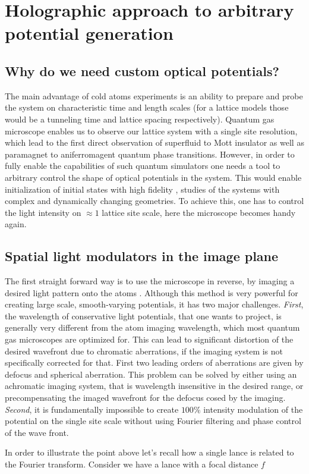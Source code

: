 
\chapter{Holographic approach to arbitrary potential generation}

\section{Why do we need custom optical potentials?}
The main advantage of cold atoms experiments is an ability to prepare and probe the system on characteristic time and length scales (for a lattice models those would be a tunneling time and lattice spacing respectively). Quantum gas microscope enables us to observe our lattice system with a single site resolution, which lead to the first direct observation of superfluid to Mott insulator \cite{Bakr2010, bloch} as well as paramagnet to aniferromagent \cite{Simon2011, Parsons??} quantum phase transitions. However, in order to fully enable the capabilities of such quantum simulators one needs a tool to arbitrary control the shape of optical potentials in the system. This would enable initialization of initial states with high fidelity \cite{us, somebody else?}, studies of the systems with complex \cite{Tilman QPC, Roatti QPC} and dynamically changing \cite{??} geometries. To achieve this, one has to control the light intensity on $\approx 1$ lattice site scale, here the microscope becomes handy again.

\section{Spatial light modulators in the image plane}
The first straight forward way is to use the microscope in reverse, by imaging a desired light pattern onto the atoms \cite{P. Schauß thesis, RMA thesis, MAZU thesis}. Although this method is very powerful for creating large scale, smooth-varying potentials, it has two major challenges. \textit{First}, the wavelength of conservative light potentials, that one wants to project, is generally very different from the atom imaging wavelength, which most quantum gas microscopes are optimized for. This can lead to significant distortion of the desired wavefront due to chromatic aberrations, if the imaging system is not specifically corrected for that. First two leading orders of aberrations are given by defocus and spherical aberration. This problem can be solved by either using an achromatic imaging system, that is wavelength insensitive in the desired range, or precompensating the imaged wavefront for the defocus cosed by the imaging. \textit{Second}, it is fundamentally impossible to create $100 \%$ intensity modulation of the potential on the single site scale without using Fourier filtering and phase control of the wave front.

In order to illustrate the point above let's recall how a single lance is related to the Fourier transform. Consider we have a lance with a focal distance $f$

